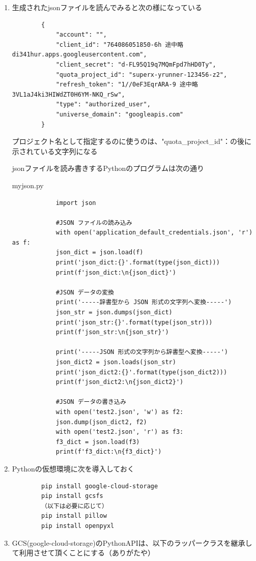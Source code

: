 \documentclass[12pt,a4paper,uplatex]{jsbook}
\begin{document}
\begin{enumerate}
	\item 生成されたjsonファイルを読んでみると次の様になっている
	\begin{verbatim}
		{
			"account": "",
			"client_id": "764086051850-6h 途中略 di341hur.apps.googleusercontent.com",
			"client_secret": "d-FL95Q19q7MQmFpd7hHD0Ty",
			"quota_project_id": "superx-yrunner-123456-z2",
			"refresh_token": "1//0eF3EqrARA-9 途中略 3VL1aJ4ki3HIWdZT0H6YM-NKQ_rSw",
			"type": "authorized_user",
			"universe_domain": "googleapis.com"
		}
	\end{verbatim}
	プロジェクト名として指定するのに使うのは、"quota\_project\_id"：の後に示されている文字列になる
	
	jsonファイルを読み書きするPythonのプログラムは次の通り
	\begin{spacing}{0.87}
	\begin{itembox}[l]{myjson.py}
		\begin{verbatim}
			import json
			
			#JSON ファイルの読み込み
			with open('application_default_credentials.json', 'r') as f:
			json_dict = json.load(f)
			print('json_dict:{}'.format(type(json_dict)))
			print(f'json_dict:\n{json_dict}')
			
			#JSON データの変換
			print('-----辞書型から JSON 形式の文字列へ変換-----')
			json_str = json.dumps(json_dict)
			print('json_str:{}'.format(type(json_str)))
			print(f'json_str:\n{json_str}')
			
			print('-----JSON 形式の文字列から辞書型へ変換-----')
			json_dict2 = json.loads(json_str)
			print('json_dict2:{}'.format(type(json_dict2)))
			print(f'json_dict2:\n{json_dict2}')
			
			#JSON データの書き込み
			with open('test2.json', 'w') as f2:
			json.dump(json_dict2, f2)
			with open('test2.json', 'r') as f3:
			f3_dict = json.load(f3)
			print(f'f3_dict:\n{f3_dict}')
		\end{verbatim}
	\end{itembox}
	\end{spacing}

	\item Pythonの仮想環境に次を導入しておく
	\begin{verbatim}
		pip install google-cloud-storage
		pip install gcsfs
		（以下は必要に応じて）
		pip install pillow
		pip install openpyxl
	\end{verbatim}
	
	\item GCS(google-cloud-storage)のPythonAPIは、以下のラッパークラス\footnotemark[7]を継承して利用させて頂くことにする（ありがたや）
	
	\setcounter{footnote}{7}
	
\end{enumerate}
\end{document}
